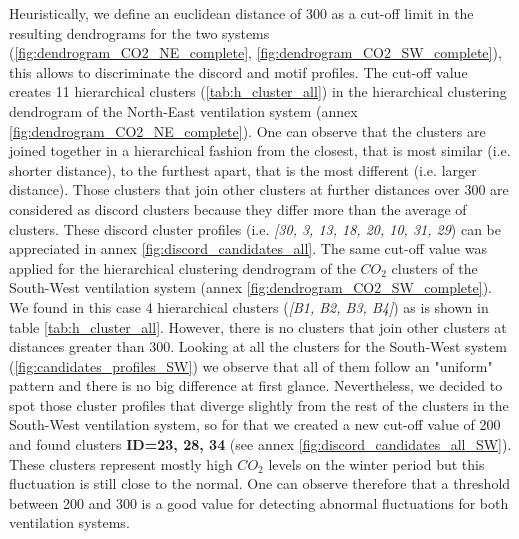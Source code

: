 Heuristically, we define an euclidean distance of 300 as a cut-off limit in the resulting dendrograms for the two systems (\ref{fig:dendrogram_CO2_NE_complete}, \ref{fig:dendrogram_CO2_SW_complete}), this allows to discriminate the discord and motif profiles. The cut-off value creates 11 hierarchical clusters (\ref{tab:h_cluster_all}) in the hierarchical clustering dendrogram of the North-East ventilation system (annex \ref{fig:dendrogram_CO2_NE_complete}). One can observe that the clusters are joined together in a hierarchical fashion from the closest, that is most similar (i.e. shorter distance), to the furthest apart, that is the most different (i.e. larger distance). Those clusters that join other clusters at further distances over 300 are considered as discord clusters because they differ more than the average of clusters. These discord cluster profiles (i.e. \textit{[30, 3, 13, 18, 20, 10, 31, 29}) can be appreciated in annex \ref{fig:discord_candidates_all}. The same cut-off value was applied for the hierarchical clustering dendrogram of the $CO_2$ clusters of the South-West ventilation system (annex \ref{fig:dendrogram_CO2_SW_complete}). We found in this case 4 hierarchical clusters (\textit{[B1, B2, B3, B4]}) as is shown in table \ref{tab:h_cluster_all}. However, there is no clusters that join other clusters at distances greater than 300. Looking at all the clusters for the South-West system (\ref{fig:candidates_profiles_SW}) we observe that all of them follow an "uniform" pattern and there is no big difference at first glance. Nevertheless, we decided to spot those cluster profiles that diverge slightly from the rest of the clusters in the South-West ventilation system, so for that we created a new cut-off value of 200 and found clusters \textbf{ID=23, 28, 34} (see annex \ref{fig:discord_candidates_all_SW}). These clusters represent mostly high $CO_2$ levels on the winter period but this fluctuation is still close to the normal. One can observe therefore that a threshold between 200 and 300 is a good value for detecting abnormal fluctuations for both ventilation systems.  \\

